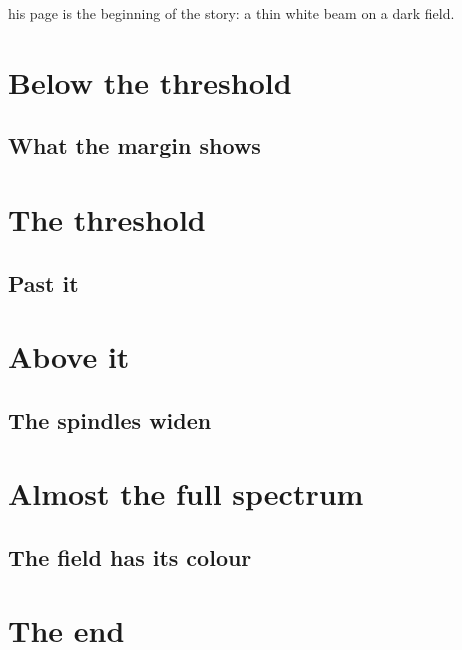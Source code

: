 \documentclass[10pt,a4paper]{article}
\begin{document}
\bigskip
{}his page is the beginning of the story: a thin white beam on a dark field. \lipsum[1]
\section{Below the threshold}\lipsum[2-6]
\subsection{What the margin shows}\lipsum[7-10]
\section{The threshold}\lipsum[11-14]
\subsection{Past it}\lipsum[15-19]
\section{Above it}\lipsum[20-26]
\subsection{The spindles widen}\lipsum[27-33]
\section{Almost the full spectrum}\lipsum[34-41]
\subsection{The field has its colour}\lipsum[42-46]
\section{The end}\lipsum[47]
\end{document}
